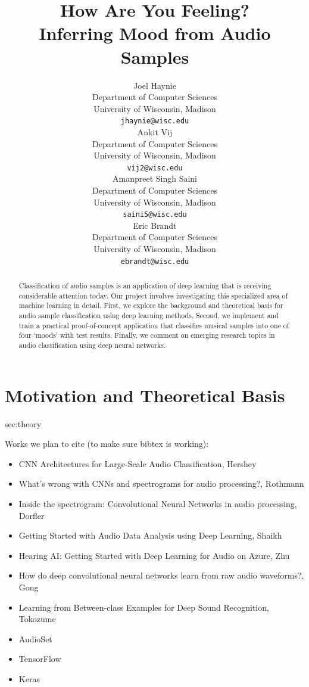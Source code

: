 \documentclass{article}
\title{How Are You Feeling? \\ Inferring Mood from Audio Samples}
\author{
  Joel Haynie \\
  Department of Computer Sciences\\
  University of Wisconsin, Madison\\
  \texttt{jhaynie@wisc.edu} \\
  \And
  Ankit Vij \\
  Department of Computer Sciences\\
  University of Wisconsin, Madison\\
  \texttt{vij2@wisc.edu} \\
  \AND
  Amanpreet Singh Saini \\
  Department of Computer Sciences\\
  University of Wisconsin, Madison\\
  \texttt{saini5@wisc.edu} \\
  \And
  Eric Brandt \\
  Department of Computer Sciences\\
  University of Wisconsin, Madison\\
  \texttt{ebrandt@wisc.edu}
}
\begin{document}

\maketitle

\begin{abstract}
Classification of audio samples is an application of deep learning that is receiving considerable attention today. Our project involves investigating this specialized area of machine learning in detail. First, we explore the background and theoretical basis for audio sample classification using deep learning methods. Second, we implement and train a practical proof-of-concept application that classifies musical samples into one of four ‘moods’ with test results. Finally, we comment on emerging research topics in audio classification using deep neural networks.
\end{abstract}

\section{Motivation and Theoretical Basis}{sec:theory}

Works we plan to cite (to make sure bibtex is working): 
\begin{itemize}
\item CNN Architectures for Large-Scale Audio Classification, Hershey\cite{hershey}
\item What’s wrong with CNNs and spectrograms for audio processing?, Rothmann\cite{rothmann}
\item Inside the spectrogram: Convolutional Neural Networks in audio processing, Dorfler\cite{dorfler}
\item Getting Started with Audio Data Analysis using Deep Learning, Shaikh\cite{shaikh}
\item Hearing AI: Getting Started with Deep Learning for Audio on Azure, Zhu\cite{zhu}
\item How do deep convolutional neural networks learn from raw audio waveforms?, Gong\cite{gong}
\item Learning from Between-class Examples for Deep Sound Recognition, Tokozume \cite{tokozume}
\item AudioSet \cite{audioset}
\item TensorFlow \cite{tensorflow}
\item Keras \cite{keras}
\end{itemize}
\end{document}
